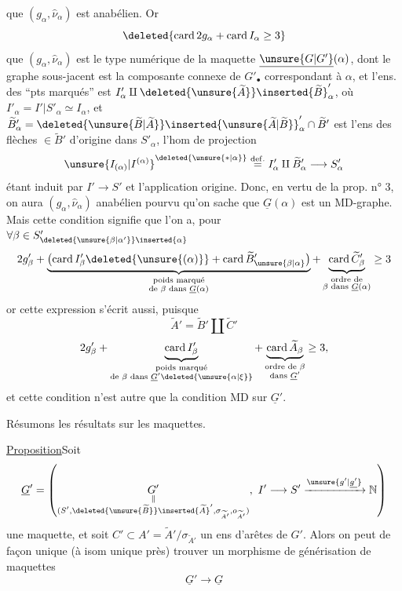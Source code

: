 que $(g_\alpha,\widehat\nu_\alpha)$ est anabélien. Or
\[
\deleted{\operatorname{card}2g_\alpha+\operatorname{card}I_\alpha\geq3}
\]
 que $(g_\alpha,\widehat\nu_\alpha)$ est le type numérique de la maquette $\underline{\unsure{G|G'}}(\alpha)$, dont le graphe sous-jacent est la composante connexe de $G'_\bullet$ correspondant à $\alpha$, et l'ens. des ``pts marqués'' est $I'_\alpha\amalg\deleted{\unsure{\widetilde A}}\inserted{\widetilde B}'_\alpha$,  où $I'_\alpha=I'|S'_\alpha\simeq I_\alpha$, et $\widetilde B'_\alpha=\deleted{\unsure{\widetilde B|\widetilde A}}\inserted{\unsure{\widetilde A|\widetilde B}}'_\alpha\cap\widetilde B'$ est l'ens des flèches $\in\widetilde B'$ d'origine dans $S'_\alpha$, l'hom de projection
\[
\unsure{I_{(\alpha)}|I^{(\alpha)}}^{\deleted{\unsure{\ast|\alpha}}}\overset{\mathrm{def.}}{=}I'_\alpha\amalg\widetilde B'_\alpha\longrightarrow S'_\alpha
\]
étant induit par $I'\to S'$ et l'application origine. Donc, en vertu de la prop.  n° 3, on aura $(g_\alpha,\widehat\nu_\alpha)$ anabélien pourvu qu'on sache que $\underline G(\alpha)$ est un MD-graphe. Mais cette condition signifie que l'on a, pour $\forall\beta\in S'_{\deleted{\unsure{\beta|\alpha'}}\inserted{\alpha}}$
\[
2g'_\beta+\underbrace{\bigl(\operatorname{card}I'_\beta\deleted{\unsure{(\alpha)}}+\operatorname{card}\widetilde B'_{\unsure{\beta|\alpha}}\bigr)}_{\substack{\text{poids marqué}\\\text{de }\beta\text{ dans }\underline G(\alpha)}}+\underbrace{\operatorname{card}\widetilde C'_\beta}_{\substack{\text{ordre de}\\\beta\text{ dans }\underline G(\alpha)}}\geq3
\]
or cette expression s'écrit aussi, puisque
\[
\widetilde A'=\widetilde B'\amalg\widetilde C'
\]
\[
2g'_\beta+\underbrace{\operatorname{card}I'_\beta}_{\substack{\text{poids marqué}\\\text{de }\beta\text{ dans }\underline G'\deleted{\unsure{\alpha|\xi}}}}+\underbrace{\operatorname{card}\widetilde A_\beta}_{\substack{\text{ordre de }\beta\\\text{dans }\underline G'}}\geq3,
\]
et cette condition n'est autre que la condition  MD sur $\underline G'$.

Résumons les résultats sur les maquettes.

\uline{Proposition}\quad Soit
\[
\underline G'=\left(\underset{\substack{\Vert\\(S',\deleted{\unsure{\widetilde B}}\inserted{\widetilde A}',\sigma_{\widetilde A'},o_{\widetilde A'})}}{G'},\ I'\longrightarrow S'\xrightarrow{\unsure{g'|\underline{g'}}}\mathbb N\right)
\]
une maquette, et soit $C'\subset A'=\widetilde A'/\sigma_{\widetilde A'}$ un ens d'arêtes de $G'$. Alors on peut de façon unique  (à isom unique près) trouver un morphisme de générisation de maquettes
\[
\underline G'\longrightarrow\underline G
\]
